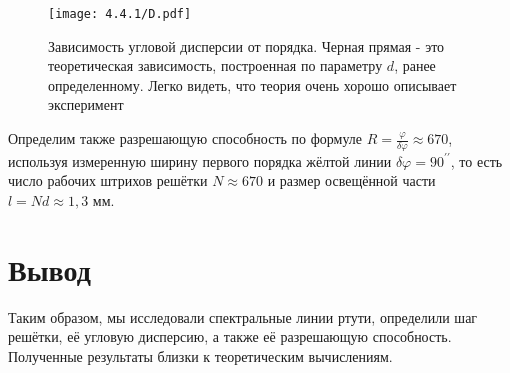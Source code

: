 \documentclass[a4paper,12pt]{article} %
\begin{document}
\begin{figure}[H]
    \centering
    \texttt{[image: 4.4.1/D.pdf]}
    \caption{\centering Зависимость угловой дисперсии от порядка. Черная прямая - это теоретическая зависимость, построенная по параметру $d$, ранее определенному. Легко видеть, что теория очень хорошо описывает эксперимент}
    \label{D}
\end{figure}

Определим также разрешающую способность по формуле $\displaystyle R = \frac{\varphi}{\delta \varphi} \approx 670$, используя измеренную ширину первого порядка жёлтой линии $\delta \varphi = 90^{ \prime \prime }$, то есть число рабочих штрихов решётки $N \approx 670$ и размер освещённой части $l = Nd \approx 1,3$ мм.

\section{Вывод}

Таким образом, мы исследовали спектральные линии ртути, определили шаг решётки, её угловую дисперсию, а также её разрешающую способность. Полученные результаты близки к теоретическим вычислениям.
\end{document}
